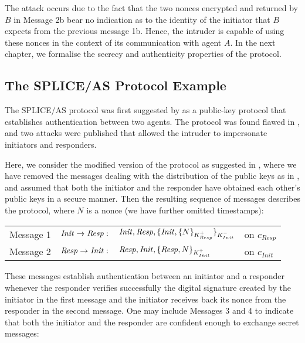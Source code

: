 \documentclass[10pt,a4paper,final,oneside,fleqn]{book}
\begin{document}
\noindent
The attack occurs due to the fact that the two nonces encrypted and returned by $B$ in Message 2b bear no indication as to the identity of the initiator that $B$ expects from the previous message 1b.  Hence, the intruder is capable of using these nonces in the context of its communication with agent $A$.  In the next chapter, we formalise the secrecy and authenticity properties of the protocol.
\subsection{The SPLICE/AS Protocol Example\label{sect:ansplice}}
The SPLICE/AS protocol was first suggested by \cite{yama1} as a public-key protocol that establishes authentication between two agents.  The protocol was found flawed in \cite{hwang1}, and two attacks were published that allowed the intruder to impersonate initiators and responders.

Here, we consider the modified version of the protocol as suggested in  \cite{hwang1}, where we have removed the messages dealing with the distribution of the public keys as in \cite{clark1}, and assumed that both the initiator and the responder have obtained each other's public keys in a secure manner. Then the resulting sequence of messages describes the protocol, where $N$ is a nonce (we have further omitted timestamps):\vspace{5mm}

\begin{tabular}{llll}
Message 1&\hspace{5mm}$\mbox{{\itshape Init\/}}\to\mbox{{\itshape Resp\/}}:$&$\mbox{{\itshape Init\/}},\mbox{{\itshape Resp\/}},\{\mbox{{\itshape Init\/}},\{N\}_{K^+_{Resp}}\}_{K^-_{Init}}$&on $c_{Resp}$\\
Message 2&\hspace{5mm}$\mbox{{\itshape Resp\/}}\to\mbox{{\itshape Init\/}}:$&$\mbox{{\itshape Resp\/}},\mbox{{\itshape Init\/}},\{\mbox{{\itshape Resp\/}},N\}_ {K^+_{Init}}$&on $c_{Init}$
\end{tabular}\vspace{5mm}

\noindent
These messages establish authentication between an initiator and a responder whenever the responder verifies successfully the digital signature created by the initiator in the first message and the initiator receives back its nonce from the responder in the second message.  One may include Messages 3 and 4 to indicate that both the initiator and the responder are confident enough to exchange secret messages:\vspace{5mm}
\end{document}
